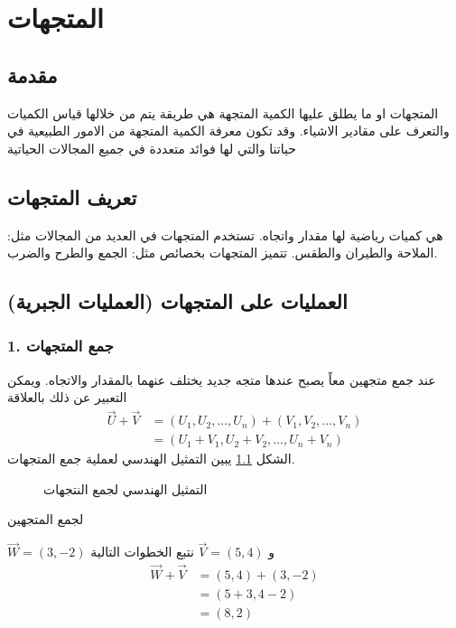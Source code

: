 \chapter{المتجهات}

\section{مقدمة}
المتجهات او ما يطلق عليها الكمية المتجهة هي طريقة يتم من خلالها قياس الكميات والتعرف على مقادير الاشياء. وقد تكون معرفة الكمية المتجهة من الامور الطبيعية في حياتنا والتي لها فوائد متعددة في جميع المجالات الحياتية

\section[تعريف المتجهات]{تعريف المتجهات \cite{key1}}
هي كميات رياضية لها مقدار واتجاه. تستخدم المتجهات في العديد من المجالات مثل: الملاحة والطيران والطقس. تتميز المتجهات بخصائص مثل: الجمع والطرح والضرب.

\section{العمليات على المتجهات (العمليات الجبرية)}
\subsection*{1. جمع المتجهات}
عند جمع متجهين معاً يصبح عندها متجه جديد يختلف عنهما بالمقدار والاتجاه. ويمكن التعبير عن ذلك بالعلاقة
\begin{align*}
	\vec{U} + \vec{V} &= (U_1, U_2, \dots, U_n) + (V_1, V_2, \dots, V_n)\\
	&= (U_1+V_1, U_2+V_2, \dots, U_n+V_n)
\end{align*}
الشكل \ref{fig:vecsum} يبين التمثيل الهندسي لعملية جمع المتجهات.
	\begin{figure}[ht]
	\centering
	\caption{التمثيل الهندسي لجمع النتجهات}
			\label{fig:vecsum}
\end{figure}
\newpage
\begin{example}
لجمع المتجهين
	
	$\vec{W} = (3,-2)$ و $\vec{V} = (5,4)$
	نتبع الخطوات التالية
	\begin{align*}
		\vec{W} + \vec{V} &= (5,4) + (3,-2)\\
		&= (5+3, 4-2)\\
		&= (8,2)
	\end{align*}
\end{example}



